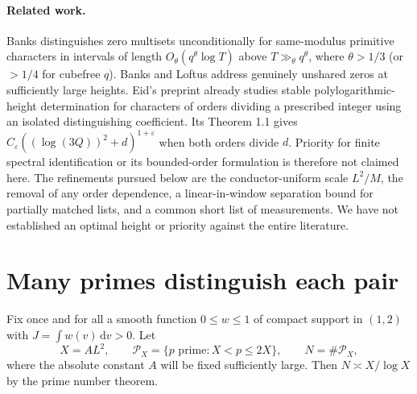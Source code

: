 \documentclass[11pt]{article}
\newcommand{\dd}{\,\mathrm d}
\newcommand{\PP}{\mathcal P}
\begin{document}
\paragraph{Related work.}
Banks \cite{banks} distinguishes zero multisets unconditionally for same-modulus primitive characters in intervals of length $O_\theta(q^\theta\log T)$ above $T\gg_\theta q^\theta$, where $\theta>1/3$ (or $>1/4$ for cubefree $q$). Banks and Loftus \cite{bl} address genuinely unshared zeros at sufficiently large heights. Eid's preprint \cite{eid} already studies stable polylogarithmic-height determination for characters of orders dividing a prescribed integer using an isolated distinguishing coefficient. Its Theorem 1.1 gives $C_\varepsilon((\log(3Q))^2+d)^{1+\varepsilon}$ when both orders divide $d$. Priority for finite spectral identification or its bounded-order formulation is therefore not claimed here. The refinements pursued below are the conductor-uniform scale $L^2/M$, the removal of any order dependence, a linear-in-window separation bound for partially matched lists, and a common short list of measurements. We have not established an optimal height or priority against the entire literature.

\section{Many primes distinguish each pair}
Fix once and for all a smooth function $0\le w\le1$ of compact support in $(1,2)$ with $J=\int w(v)\dd v>0$. Let
\begin{equation}
 X=A L^2,\qquad \PP_X=\{p\text{ prime}: X<p\le2X\}, \qquad N=\#\PP_X,\label{eq:X}
\end{equation}
where the absolute constant $A$ will be fixed sufficiently large. Then $N\asymp X/\log X$ by the prime number theorem.
\end{document}
